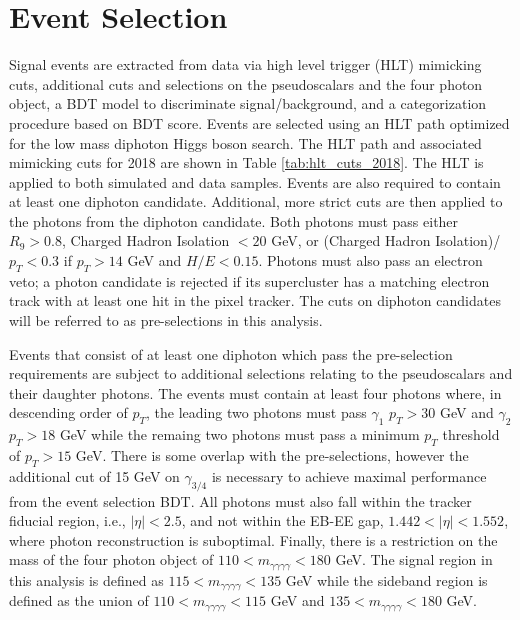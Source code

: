 \documentclass[12pt]{article}
\begin{document}
\section{Event Selection}
Signal events are extracted from data via high level trigger (HLT) mimicking cuts, additional cuts and selections on the pseudoscalars and the four photon object, a BDT model to discriminate signal/background, and a categorization procedure based on BDT score. Events are selected using an HLT path optimized for the low mass diphoton Higgs boson search. The HLT path and associated mimicking cuts for 2018 are shown in Table \ref{tab:hlt_cuts_2018}.
The HLT is applied to both simulated and data samples. Events are also required to contain at least one diphoton candidate. Additional, more strict cuts are then applied to the photons from the diphoton candidate. Both photons must pass either $R_9 > 0.8$, Charged Hadron Isolation $<20$ GeV, or (Charged Hadron Isolation)/$p_T < 0.3$ if $p_T > 14$ GeV and $H/E < 0.15$. Photons must also pass an electron veto; a photon candidate is rejected if its supercluster has a matching electron track with at least one hit in the pixel tracker. The cuts on diphoton candidates will be referred to as pre-selections in this analysis.\par

Events that consist of at least one diphoton which pass the pre-selection requirements are subject to additional selections relating to the pseudoscalars and their daughter photons. The events must contain at least four photons where, in descending order of $p_T$, the leading two photons must pass $\gamma_1$ $p_T > 30$ GeV and $\gamma_2$ $p_T > 18$ GeV while the remaing two photons must pass a minimum $p_T$ threshold of $p_{T} > 15$ GeV. There is some overlap with the pre-selections, however the additional cut of 15 GeV on $\gamma_{3/4}$ is necessary to achieve maximal performance from the event selection BDT. All photons must also fall within the tracker fiducial region, i.e., $|\eta| < 2.5$, and not within the EB-EE gap, $1.442 < |\eta| < 1.552$, where photon reconstruction is suboptimal. Finally, there is a restriction on the mass of the four photon object of $110 < m_{\gamma \gamma \gamma \gamma} < 180$ GeV. The signal region in this analysis is defined as $115 < m_{\gamma \gamma \gamma \gamma} < 135$ GeV while the sideband region is defined as the union of $110 < m_{\gamma \gamma \gamma \gamma} < 115$ GeV and $135 < m_{\gamma \gamma \gamma \gamma} < 180$ GeV.
\end{document}
